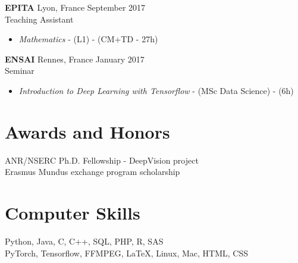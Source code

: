 \documentclass[10pt]{res} %
\begin{document}
\begin{resume}
\textbf{EPITA} \hfill Lyon, France \hfill September 2017 \\
Teaching Assistant
\begin{itemize}
	\item \textit{Mathematics} - (L1) - (CM+TD - 27h)
\end{itemize}

\textbf{ENSAI} \hfill Rennes, France \hfill January 2017 \\
Seminar
\begin{itemize}
\item \textit{Introduction to Deep Learning with Tensorflow} - (MSc Data Science) - (6h)
\end{itemize}


\section{\large Awards and Honors} 
ANR/NSERC Ph.D. Fellowship - DeepVision project \\
Erasmus Mundus exchange program scholarship


\section{\large Computer Skills} 
Python, Java, C, C++, SQL, PHP, R, SAS \\
PyTorch, Tensorflow, FFMPEG, \LaTeX, Linux, Mac, HTML, CSS



\end{resume}
\end{document}
